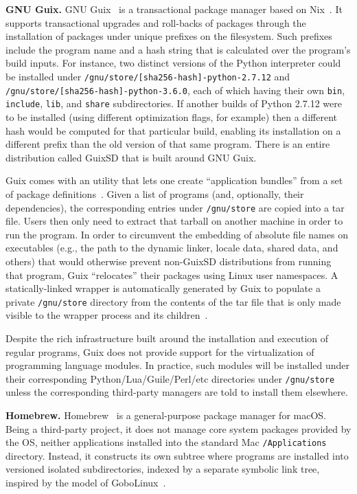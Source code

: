 \documentclass[sigplan, anonymous, 10pt]{acmart}
\begin{document}
\textbf{GNU Guix.}
GNU Guix~\cite{courtes2013:guix} is a transactional package manager based on Nix~\cite{dolstra2004:nix}.
It supports transactional upgrades and
roll-backs of packages through the installation of packages under unique prefixes on the filesystem.
Such prefixes include the program name and a hash string that is calculated over the program's
build inputs. For instance, two distinct versions of the Python interpreter could be installed
under \texttt{/gnu/store/[sha256-hash]-python-2.7.12} and \texttt{/gnu/store/[sha256-hash]-python-3.6.0},
each of which having their own \texttt{bin}, \texttt{include}, \texttt{lib}, and \texttt{share}
subdirectories. If another builds of Python 2.7.12 were to be installed (using different optimization
flags, for example) then a different hash would be computed for that particular build, enabling its
installation on a different prefix than the old version of that same program. There is an entire
distribution called GuixSD that is built around GNU Guix.

Guix comes with an utility that lets one create ``application bundles'' from a set of package
definitions~\cite{gnu2017:bundles}. Given a list of programs (and, optionally, their dependencies),
the corresponding entries under \texttt{/gnu/store} are copied into a tar file. Users then only
need to extract that tarball on another machine in order to run the program. In order to circumvent
the embedding of absolute file names on executables (e.g., the path to the dynamic linker, locale
data, shared data, and others) that would otherwise prevent non-GuixSD distributions from running
that program, Guix ``relocates'' their packages using Linux user namespaces. A statically-linked
wrapper is automatically generated by Guix to populate a private \texttt{/gnu/store} directory
from the contents of the tar file that is only made visible to the wrapper process and its
children~\cite{gnu2018:tarballs}.

Despite the rich infrastructure built around the installation and execution of regular programs,
Guix does not provide support for the virtualization of programming language modules. In practice,
such modules will be installed under their corresponding Python/Lua/Guile/Perl/etc directories
under \texttt{/gnu/store} unless the corresponding third-party managers are told to install them
elsewhere.

\textbf{Homebrew.}
Homebrew~\cite{homebrew} is a general-purpose package manager for macOS. Being a third-party project,
it does not manage core system packages provided by the OS, neither applications installed
into the standard Mac \texttt{/Applications} directory. Instead, it constructs its own
subtree where programs are installed into versioned isolated subdirectories, indexed
by a separate symbolic link tree, inspired by the model of
GoboLinux~\cite{howell2009:homebrewgobo}.
\end{document}
